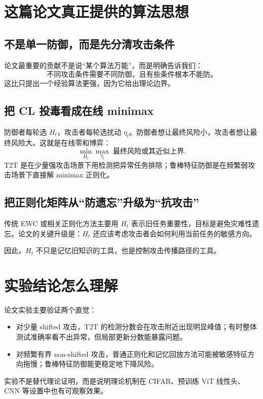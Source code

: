 \documentclass[UTF8,fontset=none,11pt]{ctexart}
\begin{document}
\section{这篇论文真正提供的算法思想}

\subsection{不是单一防御，而是先分清攻击条件}

论文最重要的贡献不是说“某个算法万能”，而是明确告诉我们：
\[
  \text{不同攻击条件需要不同防御，且有些条件根本不能防。}
\]
这比只提出一个经验算法更强，因为它给出理论边界。

\subsection{把 CL 投毒看成在线 minimax}

防御者每轮选 \(H_t\)，攻击者每轮选扰动 \(\eta_t\)。防御者想让最终风险小，攻击者想让最终风险大。这就是在线零和博弈：
\[
  \min_{H_t}\max_{\eta_t}\;\text{最终风险或其近似上界}.
\]
T2T 是在少量强攻击场景下用检测把异常任务排除；鲁棒特征防御是在频繁弱攻击场景下直接解 minimax 正则化。

\subsection{把正则化矩阵从“防遗忘”升级为“抗攻击”}

传统 EWC 或相关正则化方法主要用 \(H_t\) 表示旧任务重要性，目标是避免灾难性遗忘。论文的关键升级是：\(H_t\) 还应该考虑攻击者会如何利用当前任务的敏感方向。

因此，\(H_t\) 不只是记忆旧知识的工具，也是控制攻击传播路径的工具。

\section{实验结论怎么理解}

论文实验主要验证两个直觉：
\begin{itemize}
  \item 对少量 shifted 攻击，T2T 的检测分数会在攻击附近出现明显峰值；有时整体测试准确率看不出异常，但局部更新分数能暴露问题。
  \item 对频繁有界 non-shifted 攻击，普通正则化和记忆回放方法可能被敏感特征方向拖慢；鲁棒特征防御能更稳定地下降风险。
\end{itemize}

实验不是替代理论证明，而是说明理论机制在 CIFAR、预训练 ViT 线性头、CNN 等设置中也有可观察效果。
\end{document}
